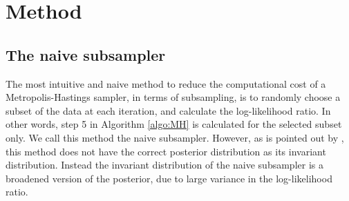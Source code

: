 \chapter{Method}\label{chap:method}
\label{sec:second}
\section{The naive subsampler}\label{subsec:naive}
The most intuitive and naive method to reduce the computational cost of a Metropolis-Hastings sampler, in terms of subsampling, is to randomly choose a subset of the data at each iteration, and calculate the log-likelihood ratio. In other words, step 5 in Algorithm \ref{algo:MH} is calculated for the selected subset only. We call this method the naive subsampler.  However, as is pointed out by \cite{Bardenet:1}, this method does not have the correct posterior distribution as its invariant distribution. Instead the invariant distribution of the naive subsampler is a broadened version of the posterior, due to large variance in the log-likelihood ratio. 
